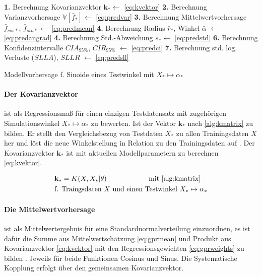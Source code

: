 \begin{algorithm}[htp]
	\SetAlgoLined
	\textbf{1.} Berechnung Kovarianzvektor $\mathbf{k}_* \leftarrow$ \autoref{eq:kvektor}\;
	\textbf{2.} Berechnung Varianzvorhersage $\mathbb{V}\left[ \bar{f}_* \right] \leftarrow$ \autoref{eq:predvar}\;
	\textbf{3.} Berechnung Mittelwertvorhersage $\bar{f}_{cos*}$, $\bar{f}_{sin*} \leftarrow$ \autoref{eq:predmean}\;
	\textbf{4.} Berechnung Radius $\bar{r}_*$, Winkel $\bar{\alpha}$ $\leftarrow$ \autoref{eq:predangrad}\;
	\textbf{4.} Berechnung Std.-Abweichung $s_* \leftarrow$ \autoref{eq:predstd}\;
	\textbf{6.} Berechnung Konfidenzintervalle $CIA_{95\%}$, $CIR_{95\%}$ $\leftarrow$ \autoref{eq:predci}\;
	\textbf{7.} Berechnung std. log. Verluste ($SLLA$), $SLLR$ $\leftarrow$ \autoref{eq:predsll}\;
	\caption{Modellvorhersage f. Sinoide eines Testwinkel mit $X_* \mapsto \alpha_*$}
	\label{alg:gprvorhersage}
\end{algorithm}


\paragraph*{Der Kovarianzvektor} ist als Regressionsmaß für einen einzigen Testdatensatz mit zugehörigen Simulationswinkel $X_* \mapsto \alpha_*$ zu bewerten. Ist der Vektor $\mathbf{k}_*$ nach \autoref{alg:kmatrix} zu bilden. Er stellt den Vergleichsbezug von Testdaten $X_*$ zu allen Trainingsdaten $X$ her und löst die neue Winkelstellung in Relation zu den Trainingsdaten auf \cite{Rasmussen2006}. Der Kovarianzvektor $\mathbf{k}_*$ ist mit aktuellen Modellparametern zu berechnen \autoref{eq:kvektor}.

\begin{align}\label{eq:kvektor}
	& \mathbf{k}_* =  K(X, X_* | \theta) \qquad\qquad\qquad \text{mit } \text{\autoref{alg:kmatrix}} \\
	& \text{f. Traingsdaten } X \text{ und } \text{einen Testwinkel } X_* \mapsto \alpha_* \nonumber
\end{align}


\clearpage


\paragraph*{Die Mittelwertvorhersage} ist als Mittelwertergebnis für eine Standardnormalverteilung einzuordnen, es ist dafür die Summe aus Mittelwertschätzung \autoref{eq:gprmean} und Produkt aus Kovarianzvektor \autoref{eq:kvektor} mit den Regressionsgewichten \autoref{eq:gprweights} zu bilden \cite{Rasmussen2006}. Jeweils für beide Funktionen Cosinus und Sinus. Die Systematische Kopplung erfolgt über den gemeinsamen Kovarianzvektor.


